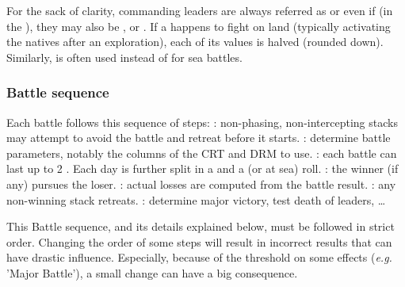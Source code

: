 
For the sack of clarity, commanding leaders are always referred as \LeaderG or
\LeaderA even if (in the \ROTW), they may also be \LeaderC, \LeaderGov or
\LeaderE. If a \LeaderE happens to fight on land (typically activating the
natives after an exploration), each of its values is halved (rounded
down). Similarly,  is often used instead of  for
sea battles.

\subsubsection{Battle sequence}
\aparag Each battle follows this sequence of steps:
\bparag {}: non-phasing, non-intercepting
stacks may attempt to avoid the battle and retreat before it starts.
\bparag {}: determine battle parameters,
notably the columns of the CRT and DRM to use.
\bparag {}: each battle can last up to 2
. Each day is further split in a  and a 
(or  at sea) roll.
\bparag {}: the winner (if any) pursues the
loser.
\bparag {}: actual losses are
computed from the battle result.
\bparag {}: any non-winning stack retreats.
\bparag {}: determine major victory, test
death of leaders, \ldots

This Battle sequence, and its details explained below, must be followed in
strict order. Changing the order of some steps will result in incorrect
results that can have drastic influence. Especially, because of the threshold
on some effects (\emph{e.g.} 'Major Battle'), a small change can have a big
consequence.

